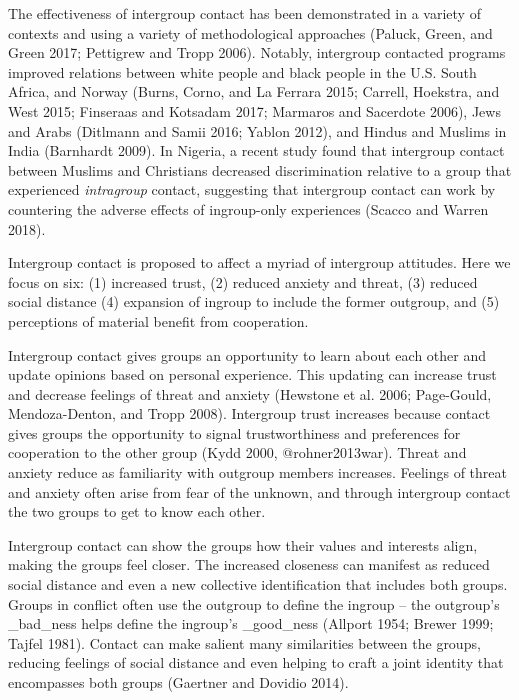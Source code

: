\documentclass[11pt]{article}
\begin{document}
The effectiveness of intergroup contact has been demonstrated in a
variety of contexts and using a variety of methodological approaches
(Paluck, Green, and Green 2017; Pettigrew and Tropp 2006). Notably,
intergroup contacted programs improved relations between white people
and black people in the U.S. South Africa, and Norway (Burns, Corno, and
La Ferrara 2015; Carrell, Hoekstra, and West 2015; Finseraas and
Kotsadam 2017; Marmaros and Sacerdote 2006), Jews and Arabs (Ditlmann
and Samii 2016; Yablon 2012), and Hindus and Muslims in India (Barnhardt
2009). In Nigeria, a recent study found that intergroup contact between
Muslims and Christians decreased discrimination relative to a group that
experienced \emph{intragroup} contact, suggesting that intergroup
contact can work by countering the adverse effects of ingroup-only
experiences (Scacco and Warren 2018).

Intergroup contact is proposed to affect a myriad of intergroup
attitudes. Here we focus on six: (1) increased trust, (2) reduced
anxiety and threat, (3) reduced social distance (4) expansion of ingroup
to include the former outgroup, and (5) perceptions of material benefit
from cooperation.

Intergroup contact gives groups an opportunity to learn about each other
and update opinions based on personal experience. This updating can
increase trust and decrease feelings of threat and anxiety (Hewstone et
al. 2006; Page-Gould, Mendoza-Denton, and Tropp 2008). Intergroup trust
increases because contact gives groups the opportunity to signal
trustworthiness and preferences for cooperation to the other group (Kydd
2000, @rohner2013war). Threat and anxiety reduce as familiarity with
outgroup members increases. Feelings of threat and anxiety often arise
from fear of the unknown, and through intergroup contact the two groups
to get to know each other.

Intergroup contact can show the groups how their values and interests
align, making the groups feel closer. The increased closeness can
manifest as reduced social distance and even a new collective
identification that includes both groups. Groups in conflict often use
the outgroup to define the ingroup -- the outgroup's \_bad\_ness helps
define the ingroup's \_good\_ness (Allport 1954; Brewer 1999; Tajfel
1981). Contact can make salient many similarities between the groups,
reducing feelings of social distance and even helping to craft a joint
identity that encompasses both groups (Gaertner and Dovidio 2014).
\end{document}

